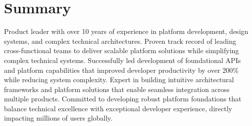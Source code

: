 \documentclass[letterpaper,11pt]{article}
\begin{document}
\makeheader

\section{Summary}
Product leader with over 10 years of experience in platform development, design systems, and complex technical architectures. Proven track record of leading cross-functional teams to deliver scalable platform solutions while simplifying complex technical systems. Successfully led development of foundational APIs and platform capabilities that improved developer productivity by over 200\% while reducing system complexity. Expert in building intuitive architectural frameworks and platform solutions that enable seamless integration across multiple products. Committed to developing robust platform foundations that balance technical excellence with exceptional developer experience, directly impacting millions of users globally.
\end{document}
